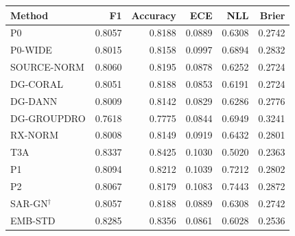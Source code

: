 \begin{tabular}{lrrrrr}
\toprule
Method & F1 & Accuracy & ECE & NLL & Brier \\
\midrule
P0 & 0.8057 & 0.8188 & 0.0889 & 0.6308 & 0.2742 \\
P0-WIDE & 0.8015 & 0.8158 & 0.0997 & 0.6894 & 0.2832 \\
SOURCE-NORM & 0.8060 & 0.8195 & 0.0878 & 0.6252 & 0.2724 \\
DG-CORAL & 0.8051 & 0.8188 & 0.0853 & 0.6191 & 0.2724 \\
DG-DANN & 0.8009 & 0.8142 & 0.0829 & 0.6286 & 0.2776 \\
DG-GROUPDRO & 0.7618 & 0.7775 & 0.0844 & 0.6949 & 0.3241 \\
RX-NORM & 0.8008 & 0.8149 & 0.0919 & 0.6432 & 0.2801 \\
T3A & 0.8337 & 0.8425 & 0.1030 & 0.5020 & 0.2363 \\
P1 & 0.8094 & 0.8212 & 0.1039 & 0.7212 & 0.2802 \\
P2 & 0.8067 & 0.8179 & 0.1083 & 0.7443 & 0.2872 \\
SAR-GN$^\dagger$ & 0.8057 & 0.8188 & 0.0889 & 0.6308 & 0.2742 \\
EMB-STD & 0.8285 & 0.8356 & 0.0861 & 0.6028 & 0.2536 \\
\bottomrule\end{tabular}
